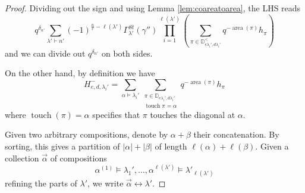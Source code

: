\documentclass{amsart}
\numberwithin{equation}{section}
\theoremstyle{definition}
\DeclareMathOperator{\touch}{touch}
\newcommand{\Dyck}{\mathbb{D}}
\DeclareMathOperator{\area}{\mathrm{area}}
\begin{document}
\begin{proof}
Dividing out the sign and using Lemma \ref{lem:coareatoarea}, the LHS reads $$q^{\delta_{n'}}\sum_{\lambda'\vdash n'} (-1)^{\frac{n}{e}-\ell(\lambda')}\Gamma^{St}_{\lambda'}(\gamma'')\prod_{i=1}^{\ell(\lambda')}\left(\sum_{\pi\in\Dyck_{e\lambda_i',d\lambda_i'}^<}q^{-\area(\pi)}h_\pi\right)$$
and we can divide out $q^{\delta_{n'}}$ on both sides. 

On the other hand, by definition we have 
$$H^-_{e,d,\lambda_i'}=\sum_{\alpha\vDash \lambda_i'}\sum_{\substack{\pi \in \Dyck_{e\lambda_i',d\lambda_i'}\\ \touch{\pi}=\alpha}} q^{-\area(\pi)}h_\pi$$
where $\touch(\pi)=\alpha$ specifies that $\pi$ touches the diagonal at $\alpha$.

Given two arbitrary compositions, denote by $\alpha+\beta$ their concatenation. By sorting, this gives a partition of $|\alpha|+|\beta|$ of length $\ell(\alpha)+\ell(\beta)$. Given a collection $\vec{\alpha}$ of compositions $$\alpha^{(1)}\vDash \lambda_1',\ldots,\alpha^{\ell(\lambda')}\vDash \lambda'_{\ell(\lambda')}$$ refining the parts of $\lambda'$,  we write $\vec{\alpha}\leftrightarrow \lambda'$.  


\end{proof}
\end{document}
